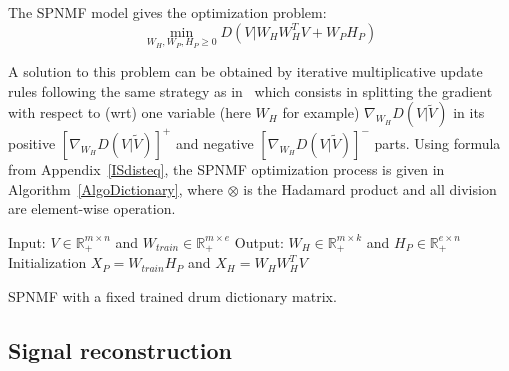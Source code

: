 \documentclass{article}
\begin{document}
The SPNMF model gives the optimization problem: 
\begin{equation}\label{InitCost}
\min_{W_H,W_P,H_P \geq 0} D(V|W_{H}W_{H}^{T}V + W_{P} H_{P})  
\end{equation}

A solution to this problem can be obtained by iterative multiplicative update rules following the same strategy as in~\cite{yuanOja2005,Lee01algorithmsfor} which consists in splitting the gradient with respect to (wrt) one variable (here $W_H$ for example) $\nabla_{W_H} D(V|\tilde{V})$ in its positive $[\nabla_{W_H} D(V|\tilde{V})]^{+}$ and negative $[\nabla_{W_H} D(V|\tilde{V})]^{-}$ parts. Using formula from Appendix~\ref{ISdisteq}, the SPNMF optimization process is given in Algorithm~\ref{AlgoDictionary}, where $\otimes$ is the Hadamard product and all division are element-wise operation.
 
\begin{algorithm}[h]
 Input: $V \in \mathbb{R}_{+}^{m \times n} $ and $ W_{train} \in \mathbb{R}_+^{m \times e}$
 Output: $W_H \in \mathbb{R}_{+}^{m \times k}$ and $H_P \in \mathbb{R}_{+}^{e \times n}$
 Initialization\;
 $ X_P = W_{train}H_P $ and
 $ X_H = W_HW_H^TV $ 
  
\vspace{0.2cm}
 \caption{SPNMF with a fixed trained drum dictionary matrix.}\label{AlgoDictionary}
\end{algorithm}




 
\subsection{Signal reconstruction}
\end{document}

